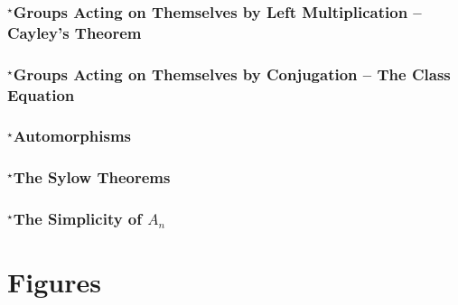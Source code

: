 \documentclass{amsbook}
\begin{document}
		\subsection{$^{\star}$Groups Acting on Themselves by Left Multiplication -- Cayley's Theorem}
		\label{sub:groups_acting_on_themselves_by_left_multiplication_cayley_s_theorem}

		\subsection{$^{\star}$Groups Acting on Themselves by Conjugation -- The Class Equation}
		\label{sub:groups_acting_on_themselves_by_conjugation_the_class_equation}

		\subsection{$^{\star}$Automorphisms}
		\label{sub:automorphisms}

		\subsection{$^{\star}$The Sylow Theorems}
		\label{sub:the_sylow_theorems}

		\subsection{$^{\star}$The Simplicity of $A_{n}$}
		\label{sub:the_simplicity_of_An}

	\appendix

	\chapter{Figures}
	\label{sec:figures}
\end{document}
